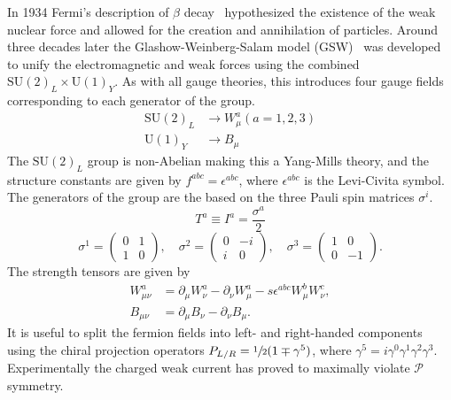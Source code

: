 In 1934 Fermi's description of $\beta$ decay~\cite{Fermi1934} hypothesized the existence of the weak nuclear force and allowed for the creation and annihilation of particles.
Around three decades later the Glashow-Weinberg-Salam model (GSW)~\cite{Glashow1961, Weinberg1967,Salam1964} was developed to unify the electromagnetic and weak forces using the combined $\text{SU}(2)_L \times \text{U}(1)_Y$.
As with all gauge theories, this introduces four gauge fields corresponding to each generator of the group.
\begin{align}
    \text{SU}(2)_L & \rightarrow W_\mu^a(a = 1, 2, 3) \\
    \text{U}(1)_Y  & \rightarrow B_\mu
\end{align}
The $\text{SU}(2)_L$ group is non-Abelian making this a Yang-Mills theory, and the structure constants are given by $f^{abc} = \epsilon^{abc}$, where $\epsilon^{abc}$ is the Levi-Civita symbol.
The generators of the group are the based on the three Pauli spin matrices $\sigma^i$.
\begin{equation}
    \label{eq:su2_generators}
    T^a \equiv I^a = \frac{\sigma^a}{2}
\end{equation}
\begin{equation}
    \sigma^1 = \begin{pmatrix} 0 & 1 \\ 1 & 0 \end{pmatrix},
    \quad \sigma^2 = \begin{pmatrix} 0 & -i \\ i & 0 \end{pmatrix},
    \quad \sigma^3 = \begin{pmatrix} 1 & 0 \\ 0 & -1 \end{pmatrix}.
    \label{eq:pauli_matrices}
\end{equation}
The strength tensors are given by
\begin{align}
    \label{eq:ew_field_strength_tensors}
    W_{\mu\nu}^a & = \partial_\mu W_\nu^a - \partial_\nu W_\mu^a - s \epsilon^{abc} W_\mu^b W_\nu^c, \\
    B_{\mu\nu}   & = \partial_\mu B_\nu - \partial_\nu B_\mu.
\end{align}
It is useful to split the fermion fields into left- and right-handed components using the chiral projection operators $P_{L/R} = \sfrac{1}{2} (1 \mp \gamma^5)$, where $\gamma^5 = i \gamma^0 \gamma^1 \gamma^2 \gamma^3$.
Experimentally the charged weak current has proved to maximally violate $\mathcal{P}$ symmetry.
